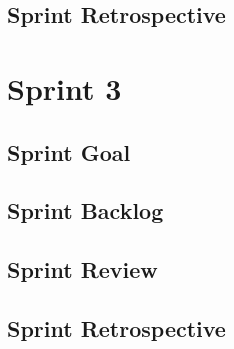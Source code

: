 \documentclass{report}
\begin{document}
    \section{Sprint Retrospective}
        
    
    \chapter{Sprint 3}
    \section{Sprint Goal}
        
    \section{Sprint Backlog}
        
    \section{Sprint Review}
        
    \section{Sprint Retrospective}
        
    
    
    
    

\nocite{*} %
\end{document}
